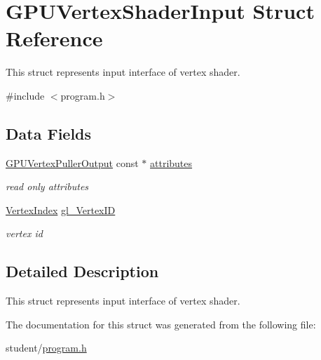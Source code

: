 \hypertarget{structGPUVertexShaderInput}{}\section{G\+P\+U\+Vertex\+Shader\+Input Struct Reference}
\label{structGPUVertexShaderInput}


This struct represents input interface of vertex shader.  




{\ttfamily \#include $<$program.\+h$>$}

\subsection*{Data Fields}
\begin{DoxyCompactItemize}
\item 
\hyperlink{structGPUVertexPullerOutput}{G\+P\+U\+Vertex\+Puller\+Output} const $\ast$ \hyperlink{structGPUVertexShaderInput_a01f1182e46873cccea824f74f0545adf}{attributes}\hypertarget{structGPUVertexShaderInput_a01f1182e46873cccea824f74f0545adf}{}\label{structGPUVertexShaderInput_a01f1182e46873cccea824f74f0545adf}

\begin{DoxyCompactList}\small\item\em read only attributes \end{DoxyCompactList}\item 
\hyperlink{fwd_8h_a83b6b93a31d7fa3fc22f37a3a0798858}{Vertex\+Index} \hyperlink{structGPUVertexShaderInput_a4f3129bf519e2153b77ac5bbd15ea990}{gl\+\_\+\+Vertex\+ID}\hypertarget{structGPUVertexShaderInput_a4f3129bf519e2153b77ac5bbd15ea990}{}\label{structGPUVertexShaderInput_a4f3129bf519e2153b77ac5bbd15ea990}

\begin{DoxyCompactList}\small\item\em vertex id \end{DoxyCompactList}\end{DoxyCompactItemize}


\subsection{Detailed Description}
This struct represents input interface of vertex shader. 

The documentation for this struct was generated from the following file\+:\begin{DoxyCompactItemize}
\item 
student/\hyperlink{program_8h}{program.\+h}\end{DoxyCompactItemize}
